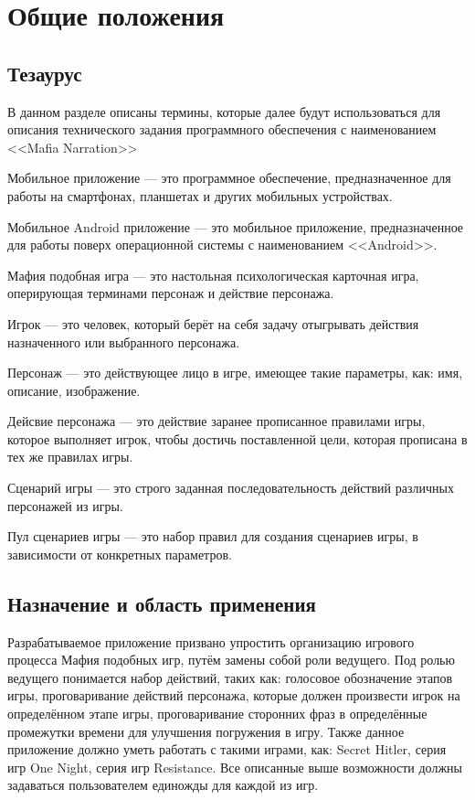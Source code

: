 \section{Общие положения}

\subsection{Тезаурус}

В данном разделе описаны термины, которые далее будут использоваться для описания технического задания программного обеспечения с наименованием <<Mafia Narration>>

Мобильное приложение --- это программное обеспечение, предназначенное для работы на смартфонах, планшетах и других мобильных устройствах.

Мобильное Android приложение --- это мобильное приложение, предназначенное для работы поверх операционной системы с наименованием <<Android>>.

Мафия подобная игра --- это настольная психологическая карточная игра, оперирующая терминами персонаж и действие персонажа.

Игрок --- это человек, который берёт на себя задачу отыгрывать действия назначенного или выбранного персонажа.

Персонаж --- это действующее лицо в игре, имеющее такие параметры, как: имя, описание, изображение.

Дейсвие персонажа --- это действие заранее прописанное правилами игры, которое выполняет игрок, чтобы достичь поставленной цели, которая прописана в тех же правилах игры.

Сценарий игры --- это строго заданная последовательность действий различных персонажей из игры.

Пул сценариев игры --- это набор правил для создания сценариев игры, в зависимости от конкретных параметров.

\subsection{Назначение и область применения}

Разрабатываемое приложение призвано упростить организацию игрового процесса Мафия подобных игр, путём замены собой роли ведущего. Под ролью ведущего понимается набор действий, таких как: голосовое обозначение этапов игры, проговаривание действий персонажа, которые должен произвести игрок на определённом этапе игры, проговаривание сторонних фраз в определённые промежутки времени для улучшения погружения в игру. Также данное приложение должно уметь работать с такими играми, как: Secret Hitler, серия игр One Night, серия игр Resistance. Все описанные выше возможности должны задаваться пользователем единожды для каждой из игр.
